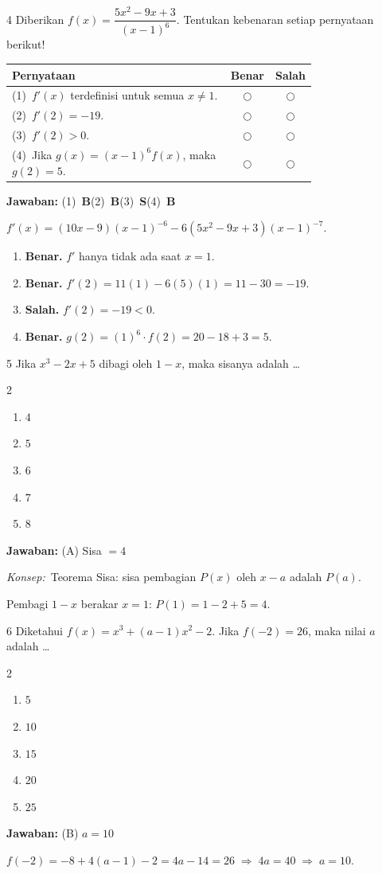 \documentclass[11pt]{article}
\newcommand{\jawaban}[1]{%
  \noindent\colorbox{gold!30}{\parbox{\dimexpr\linewidth-2\fboxsep\relax}{%
    \textbf{Jawaban:} #1}}\par\smallskip}
\newcommand{\konsep}{\noindent\textit{Konsep:}\ \ignorespaces}
\newenvironment{pilB}{%
  \par\smallskip\begin{multicols}{2}
  \begin{enumerate}[label=(\Alph*),leftmargin=*,itemsep=1pt,topsep=3pt]}%
  {\end{enumerate}\end{multicols}}
\begin{document}
\begin{soal}{4}
Diberikan $f(x)=\dfrac{5x^2-9x+3}{(x-1)^6}$.
Tentukan kebenaran setiap pernyataan berikut!

\par\smallskip
{\renewcommand{\arraystretch}{1.4}%
\begin{tabular}{@{}p{0.76\linewidth}cc@{}}
\hline\textbf{Pernyataan}&\textbf{Benar}&\textbf{Salah}\\\hline
(1)~$f'(x)$ terdefinisi untuk semua $x\neq1$.&$\bigcirc$&$\bigcirc$\\
(2)~$f'(2)=-19$.&$\bigcirc$&$\bigcirc$\\
(3)~$f'(2)>0$.&$\bigcirc$&$\bigcirc$\\
(4)~Jika $g(x)=(x-1)^6f(x)$, maka $g(2)=5$.&$\bigcirc$&$\bigcirc$\\\hline
\end{tabular}}
\end{soal}
\begin{pembox}
\jawaban{(1)~\textbf{B}\quad(2)~\textbf{B}\quad(3)~\textbf{S}\quad(4)~\textbf{B}}
$f'(x)=(10x-9)(x-1)^{-6}-6(5x^2-9x+3)(x-1)^{-7}$.
\begin{enumerate}[leftmargin=*,topsep=2pt,itemsep=2pt]
\item \textbf{Benar.} $f'$ hanya tidak ada saat $x=1$.
\item \textbf{Benar.} $f'(2)=11(1)-6(5)(1)=11-30=-19$.
\item \textbf{Salah.} $f'(2)=-19<0$.
\item \textbf{Benar.} $g(2)=(1)^6\cdot f(2)=20-18+3=5$.
\end{enumerate}
\end{pembox}

\begin{soal}{5}
Jika $x^3-2x+5$ dibagi oleh $1-x$, maka sisanya adalah \ldots
\begin{pilB}\item $4$\item $5$\item $6$\item $7$\item $8$\end{pilB}
\end{soal}
\begin{pembox}
\jawaban{(A) Sisa $= 4$}
\konsep Teorema Sisa: sisa pembagian $P(x)$ oleh $x-a$ adalah $P(a)$.

Pembagi $1-x$ berakar $x=1$: $P(1)=1-2+5=4$.
\end{pembox}

\begin{soal}{6}
Diketahui $f(x)=x^3+(a-1)x^2-2$. Jika $f(-2)=26$, maka nilai $a$ adalah \ldots
\begin{pilB}\item $5$\item $10$\item $15$\item $20$\item $25$\end{pilB}
\end{soal}
\begin{pembox}
\jawaban{(B) $a=10$}
$f(-2)=-8+4(a-1)-2=4a-14=26\;\Rightarrow\;4a=40\;\Rightarrow\;a=10$.
\end{pembox}
\end{document}
